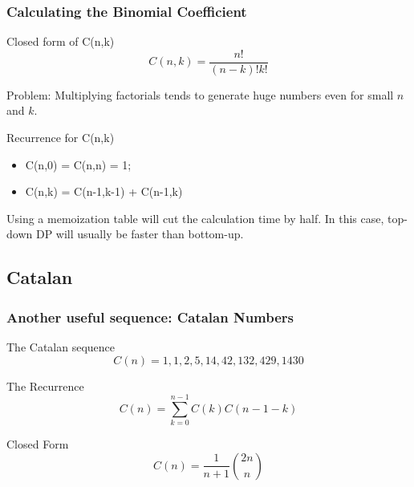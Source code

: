 \begin{frame}
  \frametitle{Calculating the Binomial Coefficient}
  {\smaller

    \begin{block}{Closed form of C(n,k)}
      \begin{equation*}
        C(n,k) = \frac{n!}{(n-k)!k!}
      \end{equation*}

      \alert{Problem}: Multiplying factorials tends to generate huge numbers
      even for small $n$ and $k$.
    \end{block}

    \begin{block}{Recurrence for C(n,k)}
      \begin{itemize}
      \item C(n,0) = C(n,n) = 1;
      \item C(n,k) = C(n-1,k-1) + C(n-1,k)
      \end{itemize}

      Using a memoization table will cut the calculation time by
      half. In this case, top-down DP will usually be faster than
      bottom-up.
    \end{block}
  }
\end{frame}

\subsection{Catalan}

\begin{frame}
  \frametitle{Another useful sequence: Catalan Numbers}
  {\smaller
  \begin{block}{The Catalan sequence}
    \begin{equation*}
      C(n) = 1, 1, 2, 5, 14, 42, 132, 429, 1430
    \end{equation*}
  \end{block}

  \begin{exampleblock}{The Recurrence}
    \begin{equation*}
    C(n) = \sum^{n-1}_{k=0}C(k)C(n-1-k)
    \end{equation*}
  \end{exampleblock}

  \begin{exampleblock}{Closed Form}
    \begin{equation*}
      C(n) = \frac{1}{n+1}\binom{2n}{n}
    \end{equation*}
  \end{exampleblock}
  }
\end{frame}


